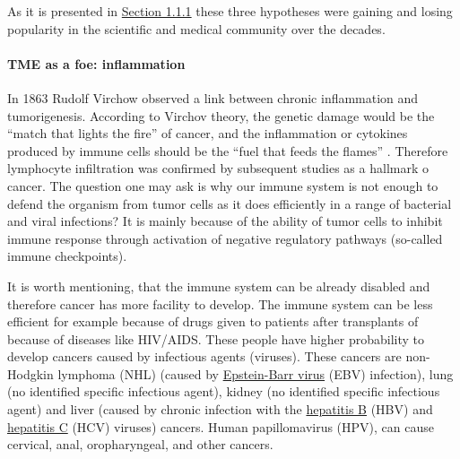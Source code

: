 \documentclass[12pt,]{book}
\let\oldparagraph\paragraph
\renewcommand{\paragraph}[1]{\oldparagraph{#1}\mbox{}}
\theoremstyle{definition}
\theoremstyle{definition}
\theoremstyle{definition}
\theoremstyle{remark}
\begin{document}
As it is presented in \protect\hyperlink{hist}{Section 1.1.1} these
three hypotheses were gaining and losing popularity in the scientific
and medical community over the decades.

\hypertarget{tme-as-a-foe-inflammation}{%
\paragraph{TME as a foe: inflammation}\label{tme-as-a-foe-inflammation}}

In 1863 Rudolf Virchow observed a link between chronic inflammation and
tumorigenesis. According to Virchov theory, the genetic damage would be
the ``match that lights the fire'' of cancer, and the inflammation or
cytokines produced by immune cells should be the ``fuel that feeds the
flames'' \citep{Balkwill2001}. Therefore lymphocyte infiltration was
confirmed by subsequent studies as a hallmark o cancer. The question one
may ask is why our immune system is not enough to defend the organism
from tumor cells as it does efficiently in a range of bacterial and
viral infections? It is mainly because of the ability of tumor cells to
inhibit immune response through activation of negative regulatory
pathways (so-called immune checkpoints).

It is worth mentioning, that the immune system can be already disabled
and therefore cancer has more facility to develop. The immune system can
be less efficient for example because of drugs given to patients after
transplants of because of diseases like HIV/AIDS. These people have
higher probability to develop cancers caused by infectious agents
(viruses). These cancers are non-Hodgkin lymphoma (NHL) (caused by
\href{https://www.cancer.gov/Common/PopUps/popDefinition.aspx?id=CDR0000045684\&version=Patient\&language=English}{Epstein-Barr
virus} (EBV) infection), lung (no identified specific infectious agent),
kidney (no identified specific infectious agent) and liver (caused by
chronic infection with the
\href{https://www.cancer.gov/Common/PopUps/popDefinition.aspx?id=CDR0000046146\&version=Patient\&language=English}{hepatitis
B} (HBV) and
\href{https://www.cancer.gov/Common/PopUps/popDefinition.aspx?id=CDR0000044139\&version=Patient\&language=English}{hepatitis
C} (HCV) viruses) cancers. Human papillomavirus (HPV), can cause
cervical, anal, oropharyngeal, and other cancers.
\end{document}
